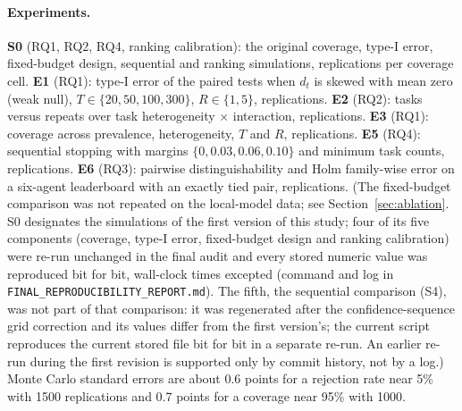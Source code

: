 \paragraph{Experiments.} \textbf{S0} (RQ1, RQ2, RQ4, ranking calibration): the original coverage, type-I error, fixed-budget design, sequential and ranking simulations, \simReps{} replications per coverage cell. \textbf{E1} (RQ1): type-I error of the paired tests when $d_t$ is skewed with mean zero (weak null), $T\in\{20,50,100,300\}$, $R\in\{1,5\}$, \asymReps{} replications. \textbf{E2} (RQ2): tasks versus repeats over task heterogeneity $\times$ interaction, \allocReps{} replications. \textbf{E3} (RQ1): coverage across prevalence, heterogeneity, $T$ and $R$, \covrobReps{} replications. \textbf{E5} (RQ4): sequential stopping with margins $\{0,0.03,0.06,0.10\}$ and minimum task counts, \seqmReps{} replications. \textbf{E6} (RQ3): pairwise distinguishability and Holm family-wise error on a six-agent leaderboard with an exactly tied pair, \rankpwReps{} replications. (The fixed-budget comparison was not repeated on the local-model data; see Section~\ref{sec:ablation}. S0 designates the simulations of the first version of this study; four of its five components (coverage, type-I error, fixed-budget design and ranking calibration) were re-run unchanged in the final audit and every stored numeric value was reproduced bit for bit, wall-clock times excepted (command and log in \texttt{FINAL\_REPRODUCIBILITY\_REPORT.md}). The fifth, the sequential comparison (S4), was not part of that comparison: it was regenerated after the confidence-sequence grid correction and its values differ from the first version's; the current script reproduces the current stored file bit for bit in a separate re-run. An earlier re-run during the first revision is supported only by commit history, not by a log.) Monte Carlo standard errors are about 0.6 points for a rejection rate near 5\% with 1500 replications and 0.7 points for a coverage near 95\% with 1000.

